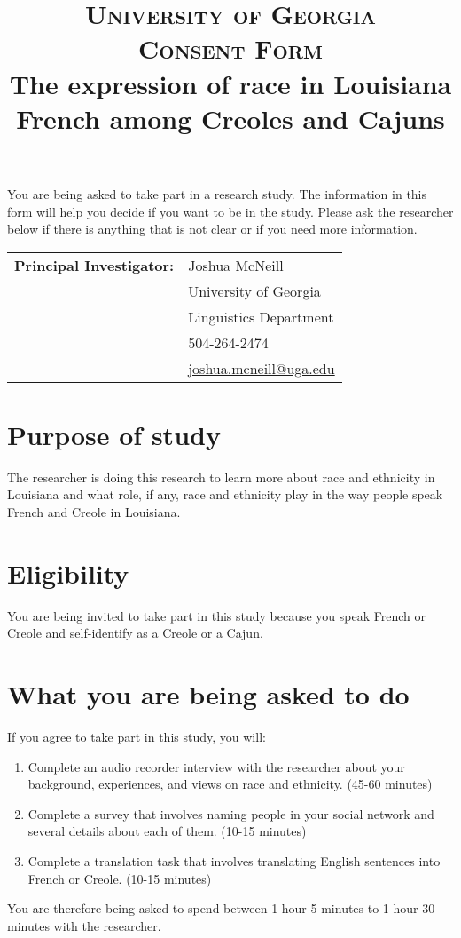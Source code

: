 \documentclass{article}
\title{\textsc{
           University of Georgia \\
           Consent Form \\
         }
         The expression of race in Louisiana French among Creoles and Cajuns}
\date{}
\newcommand{\tabhead}[1]{\textbf{#1}}
\begin{document}
    \maketitle
    You are being asked to take part in a research study.
    The information in this form will help you decide if you want to be in the study.
    Please ask the researcher below if there is anything that is not clear or if you need more information.
    \begin{center}
      \begin{tabular}{l l}
        \tabhead{Principal Investigator:} & Joshua McNeill \\
                                          & University of Georgia \\
                                          & Linguistics Department \\
                                          & 504-264-2474 \\
                                          & \href{mailto:joshua.mcneill@uga.edu}{joshua.mcneill@uga.edu}
      \end{tabular}
    \end{center}

    \section{Purpose of study}
      The researcher is doing this research to learn more about race and ethnicity in Louisiana and what role, if any, race and ethnicity play in the way people speak French and Creole in Louisiana.

    \section{Eligibility}
      You are being invited to take part in this study because you speak French or Creole and self-identify as a Creole or a Cajun.

    \section{What you are being asked to do}
      If you agree to take part in this study, you will:
      \begin{enumerate}
        \item Complete an audio recorder interview with the researcher about your background, experiences, and views on race and ethnicity. (45-60 minutes)
        \item Complete a survey that involves naming people in your social network and several details about each of them. (10-15 minutes)
        \item Complete a translation task that involves translating English sentences into French or Creole. (10-15 minutes)
      \end{enumerate}
      You are therefore being asked to spend between 1 hour 5 minutes to 1 hour 30 minutes with the researcher.
\end{document}
